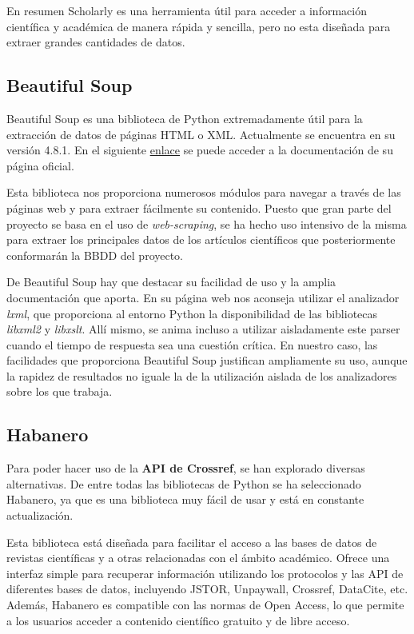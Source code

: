 En resumen Scholarly es una herramienta útil para acceder a información científica y académica de manera rápida y sencilla, pero no esta diseñada para extraer grandes cantidades de datos.

\subsection{Beautiful Soup}
Beautiful Soup es una biblioteca de Python extremadamente útil para la extracción de datos de páginas HTML o XML. Actualmente se encuentra en su versión 4.8.1. En el siguiente \href{https://beautiful-soup-4.readthedocs.io/en/latest/}{enlace} se puede acceder a la documentación de su página oficial. 

Esta biblioteca nos proporciona numerosos módulos para navegar a través de las páginas web y para extraer fácilmente su contenido. Puesto que gran parte del proyecto se basa en el uso de \textit{web-scraping}, se ha hecho uso intensivo de la misma para extraer los principales datos de los artículos científicos que posteriormente conformarán la BBDD del proyecto.

De Beautiful Soup hay que destacar su facilidad de uso y la amplia documentación que aporta. En su página web nos aconseja utilizar el analizador \textit{lxml}, que proporciona al entorno Python la disponibilidad de las bibliotecas \textit{libxml2} y \textit{libxslt}. Allí mismo, se anima incluso a utilizar aisladamente este parser cuando el tiempo de respuesta sea una cuestión crítica. En nuestro caso, las facilidades que proporciona Beautiful Soup justifican ampliamente su uso, aunque la  rapidez de resultados no iguale la de la utilización aislada de los analizadores sobre los que trabaja.
 

\subsection{Habanero}
Para poder hacer uso de la \textbf{API de Crossref}, se han explorado diversas alternativas. De entre todas las bibliotecas de Python se ha seleccionado Habanero, ya que es una biblioteca muy fácil de usar y está en constante actualización.

Esta biblioteca está diseñada para facilitar el acceso a las bases de datos de revistas científicas y a otras relacionadas con el ámbito académico. Ofrece una interfaz simple para recuperar información utilizando los protocolos y las API de diferentes bases de datos, incluyendo JSTOR, Unpaywall, Crossref, DataCite, etc. Además, Habanero es compatible con las normas de Open Access, lo que permite a los usuarios acceder a contenido científico gratuito y de libre acceso.


